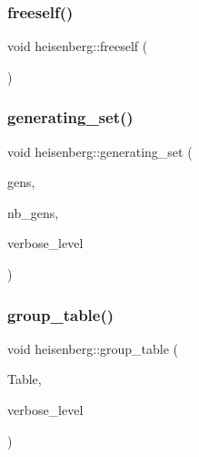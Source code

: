\mbox{\label{classheisenberg_a3196baf0d43d79f3643cd6612ba51d2d}} 
\subsubsection{\texorpdfstring{freeself()}{freeself()}}
{\footnotesize\ttfamily void heisenberg\+::freeself (\begin{DoxyParamCaption}{ }\end{DoxyParamCaption})}

\mbox{\label{classheisenberg_a69e3d98a78cd340be18532fc693e9b24}} 
\subsubsection{\texorpdfstring{generating\+\_\+set()}{generating\_set()}}
{\footnotesize\ttfamily void heisenberg\+::generating\+\_\+set (\begin{DoxyParamCaption}\item[{\mbox{\hyperlink{galois_8h_a09fddde158a3a20bd2dcadb609de11dc}{I\+NT}} $\ast$\&}]{gens,  }\item[{\mbox{\hyperlink{galois_8h_a09fddde158a3a20bd2dcadb609de11dc}{I\+NT}} \&}]{nb\+\_\+gens,  }\item[{\mbox{\hyperlink{galois_8h_a09fddde158a3a20bd2dcadb609de11dc}{I\+NT}}}]{verbose\+\_\+level }\end{DoxyParamCaption})}

\mbox{\label{classheisenberg_abe0b5eb10368096b3cb0fca084d00cff}} 
\subsubsection{\texorpdfstring{group\+\_\+table()}{group\_table()}}
{\footnotesize\ttfamily void heisenberg\+::group\+\_\+table (\begin{DoxyParamCaption}\item[{\mbox{\hyperlink{galois_8h_a09fddde158a3a20bd2dcadb609de11dc}{I\+NT}} $\ast$\&}]{Table,  }\item[{\mbox{\hyperlink{galois_8h_a09fddde158a3a20bd2dcadb609de11dc}{I\+NT}}}]{verbose\+\_\+level }\end{DoxyParamCaption})}


